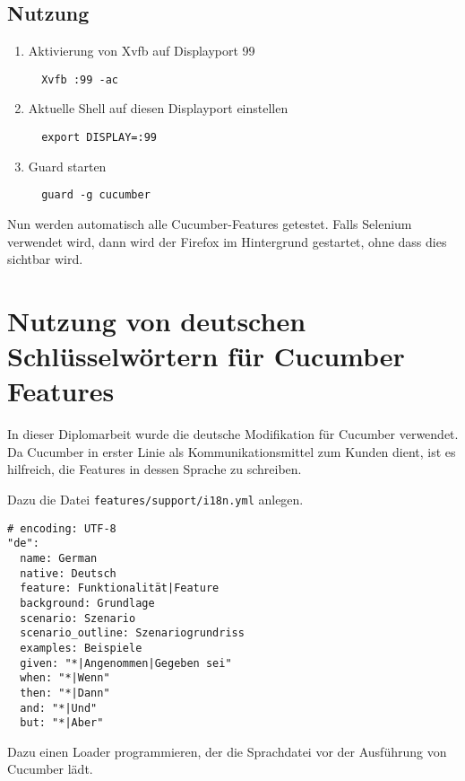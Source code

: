\subsection*{Nutzung}

\begin{enumerate}
 \item Aktivierung von Xvfb auf Displayport 99
 \begin{verbatim}
  Xvfb :99 -ac
 \end{verbatim}
 
 \item Aktuelle Shell auf diesen Displayport einstellen
 \begin{verbatim}
  export DISPLAY=:99
 \end{verbatim}
 
 \item Guard starten
 \begin{verbatim}
  guard -g cucumber
 \end{verbatim}
\end{enumerate}

Nun werden automatisch alle Cucumber-Features getestet. Falls Selenium verwendet wird, dann wird der Firefox im Hintergrund gestartet, ohne dass dies sichtbar wird.



\section{Nutzung von deutschen Schlüsselwörtern für Cucumber Features}

In dieser Diplomarbeit wurde die deutsche Modifikation für Cucumber verwendet. Da Cucumber in erster Linie als Kommunikationsmittel zum Kunden dient, ist es hilfreich, die Features in dessen Sprache zu schreiben.

Dazu die Datei \texttt{features/support/i18n.yml} anlegen.

\begin{lstlisting}[name=cucumber-lang,caption=features/support/i18n.yml,label=cucumber-lang]
# encoding: UTF-8
"de":
  name: German
  native: Deutsch
  feature: Funktionalität|Feature
  background: Grundlage
  scenario: Szenario
  scenario_outline: Szenariogrundriss
  examples: Beispiele
  given: "*|Angenommen|Gegeben sei"
  when: "*|Wenn"
  then: "*|Dann"
  and: "*|Und"
  but: "*|Aber"
\end{lstlisting}

Dazu einen Loader programmieren, der die Sprachdatei vor der Ausführung von Cucumber lädt.

